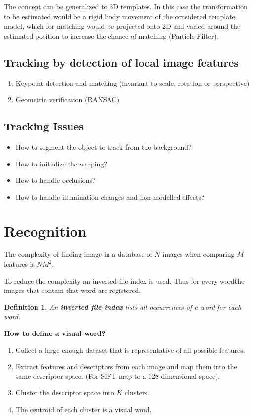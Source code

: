 \documentclass[10pt,a4paper]{scrartcl}
\newtheorem{define}{Definition}
\begin{document}
\begin{multicols*}{2}
The concept can be generalized to 3D templates. In this case the transformation to be estimated would be a rigid body movement of the considered template model, which for matching would be projected onto 2D and varied around the estimated position to increase the chance of matching (Particle Filter).

\subsection{Tracking by detection of local image features}

\begin{enumerate}
\item Keypoint detection and matching (invariant to scale, rotation or perspective)
\item Geometric verification (RANSAC)
\end{enumerate}

\subsection{Tracking Issues}

\begin{itemize}
\item How to segment the object to track from the background?
\item How to initialize the warping?
\item How to handle occlusions?
\item How to handle illumination changes and non modelled effects?
\end{itemize}

\section{Recognition}

The complexity of finding image in a database of $N$ images when comparing $M$ features is $NM^2$.

\vspace{3ex}

To reduce the complexity an inverted file index is used. Thus for every \glqq word\grqq  the images that contain that word are registered.

\begin{define}
An \textbf{inverted file index} lists all occurrences of a word for each word.
\end{define}

\vspace{3ex}
\textbf{How to define a visual \glqq word\grqq?}
\begin{enumerate}
\item Collect a large enough dataset that is representative of all possible features.
\item Extract features and descriptors from each image and map them into the same descriptor space. (For SIFT map to a 128-dimensional space).
\item Cluster the descriptor space into $K$ clusters.
\item The centroid of each cluster is a visual word.
\end{enumerate}


\end{multicols*}
\end{document}
